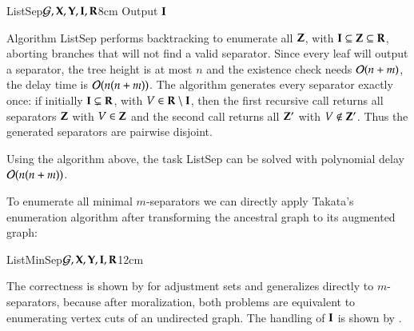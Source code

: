 \begin{algo}{ListSep}{${\cal G}, {\bf X}, {\bf Y}, {\bf I}, {\bf R}$}{\label{algo:enumsep}}{8cm}
%
    \If{$\bI = \bR$} 
    {Output ${\bf I}$}
    \Else
%
%
    \EndIf
    \EndIf
%
\end{algo}


\begin{analal}
Algorithm {\sc ListSep} performs backtracking to enumerate all ${\bf Z}$, with ${\bf I} \subseteq {\bf Z} \subseteq {\bf R}$, aborting branches that will not find a valid separator. Since every leaf will output a separator, the tree height is at most $n$ and the existence check needs ${\cal O}(n+m)$, the delay time is ${\cal O}(n(n+m))$.  
The algorithm generates every separator exactly once: if initially ${\bf I} \subsetneq {\bf R}$, with $V\in {\bf R}\setminus {\bf I}$, then the first recursive call returns all separators ${\bf Z}$ with $V\in {\bf Z}$ and the second call returns all ${\bf Z}'$ with $V\not\in {\bf Z}'$. Thus the generated separators are pairwise disjoint.  
\end{analal}

\begin{proposition}\label{prop:ListSep}
Using the algorithm above, the task 
{\sc ListSep} can be solved with polynomial delay ${\cal O}(n(n+m))$.
\end{proposition}



To enumerate all minimal $ m $-separators we can directly apply Takata's enumeration algorithm \cite{Takata2010} after transforming the ancestral graph to its augmented graph:

\begin{algo}{ListMinSep}{${\cal G}, {\bf X}, {\bf Y}, {\bf I}, {\bf R}$}{\label{algo:enumminimalsep}}{12cm} 
\end{algo}

\begin{analal}
The correctness is shown by \citet{TextorLiskiewicz2011} for
adjustment sets and generalizes directly to $m$-separators,
because after moralization, both problems are equivalent to
enumerating vertex cuts of an undirected graph. The handling
of ${\bf I}$ is shown by \citet{Acid1996}.
\end{analal}

